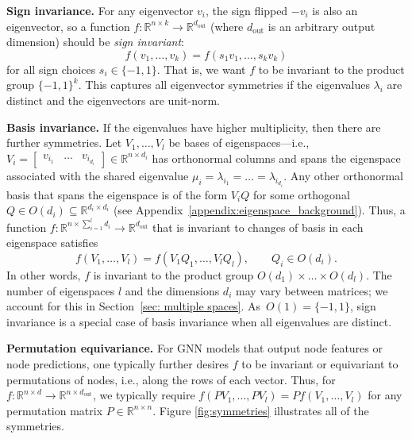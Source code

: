 \documentclass{article} \usepackage{iclr2023_conference,times}
\newcommand{\RR}{\mathbb R}
\newcommand{\mrm}[1]{\mathrm{#1}}
\newcommand{\dout}{d_{\mrm{out}}}
\begin{document}
\textbf{Sign invariance.} For any eigenvector $v_i$, the sign flipped $-v_i$ is also an eigenvector,
so a function $f: \RR^{n \times k} \to \RR^{\dout}$ (where $\dout$ is an arbitrary output dimension) should be \textit{sign invariant}:
\begin{equation}
    f(v_1, \ldots, v_k) = f(s_1 v_1, \ldots, s_k v_k)
\end{equation}
for all sign choices $s_i \in \{-1, 1\}$. That is, we want $f$ to be invariant to the product group $\{-1, 1\}^k$. This captures all eigenvector symmetries if the eigenvalues $\lambda_i$ are distinct and the eigenvectors are unit-norm.

\textbf{Basis invariance.} If the eigenvalues have higher multiplicity, then there are further symmetries. Let $V_1, \ldots, V_l$ be bases of eigenspaces---i.e., $V_i = \begin{bmatrix} v_{i_1}  & \ldots &  v_{i_{d_i}} \end{bmatrix} \in \RR^{n \times d_i}$ has orthonormal columns and spans the eigenspace associated with the shared eigenvalue $\mu_i = \lambda_{i_1} = \ldots = \lambda_{i_{d_i}}$. Any other orthonormal basis that spans the eigenspace is of the form $V_i Q$ for some orthogonal $Q \in O(d_i) \subseteq \RR^{d_i \times d_i}$ (see Appendix~\ref{appendix:eigenspace_background}). Thus, a function $f: \RR^{n \times \sum_{i=1}^l d_i} \to \RR^{\dout}$ that is invariant to changes of basis in each eigenspace satisfies 
\begin{equation}
    f(V_1, \ldots, V_l) = f(V_1 Q_1, \ldots, V_l Q_l), \qquad Q_i \in O(d_i).
\end{equation}
In other words, $f$ is invariant to the product group $O(d_1) \times \ldots \times O(d_l)$. The number of eigenspaces $l$ and the dimensions $d_i$ may vary between matrices; we account for this in Section~\ref{sec: multiple spaces}. As~$O(1) = \{-1, 1\}$, sign invariance is a special case of basis invariance when all eigenvalues are distinct.

\textbf{Permutation equivariance.} For GNN models that output node features or node predictions, one typically further desires $f$ to be invariant or equivariant to permutations of nodes, i.e., along the rows of each vector. 
Thus, for $f: \RR^{n \times d} \to \RR^{n \times \dout}$, we typically require $f(PV_1, \ldots, PV_l) = Pf(V_1, \ldots, V_l)$ for any permutation matrix $P \in \RR^{n \times n}$. Figure \ref{fig:symmetries} illustrates all of the symmetries.
\end{document}
